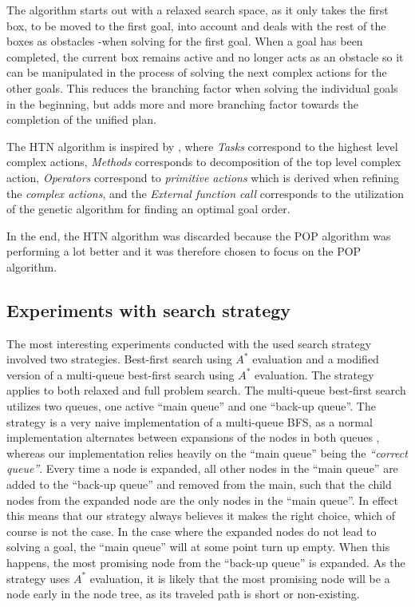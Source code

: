\documentclass[Main]{subfiles}
\begin{document}
The algorithm starts out with a relaxed search space, as it only takes the first box, to be moved to the first goal, into account and deals with the rest of the boxes as obstacles -when solving for the first goal.
When a goal has been completed, the current box remains active and no longer acts as an obstacle so it can be manipulated in the process of solving the next complex actions for the other goals.
This reduces the branching factor when solving the individual goals in the beginning, but adds more and more branching factor towards the completion of the unified plan.

The HTN algorithm is inspired by \cite{nau2003shop2}, where \textit{Tasks} correspond to the highest level complex actions, \textit{Methods} corresponds to decomposition of the top level complex action, \textit{Operators} correspond to \textit{primitive actions} which is derived when refining the \textit{complex actions}, and the \textit{External function call} corresponds to the utilization of the genetic algorithm for finding an optimal goal order.

In the end, the HTN algorithm was discarded because the POP algorithm was performing a lot better and it was therefore chosen to focus on the POP algorithm.





\subsection{Experiments with search strategy}
\label{experiments_search_strategy}

The most interesting experiments conducted with the used search strategy involved two strategies. Best-first search using $A^*$ evaluation and a modified version of a multi-queue best-first search using $A^*$ evaluation. The strategy applies to both relaxed and full problem search. 
The multi-queue best-first search utilizes two queues, one active ``main queue'' and one ``back-up queue''. The strategy is a very naive implementation of a multi-queue BFS, as a normal implementation alternates between expansions of the nodes in both queues \citep{hector2013a}, whereas our implementation relies heavily on the ``main queue'' being the \textit{``correct queue''}. Every time a node is expanded, all other nodes in the ``main queue'' are added to the ``back-up queue'' and removed from the main, such that the child nodes from the expanded node are the only nodes in the ``main queue''. In effect this means that our strategy always believes it makes the right choice, which of course is not the case. In the case where the expanded nodes do not lead to solving a goal, the ``main queue'' will at some point turn up empty. When this happens, the most promising node from the ``back-up queue'' is expanded. As the strategy uses $A^*$ evaluation, it is likely that the most promising node will be a node early in the node tree, as its traveled path is short or non-existing. 
\end{document}
